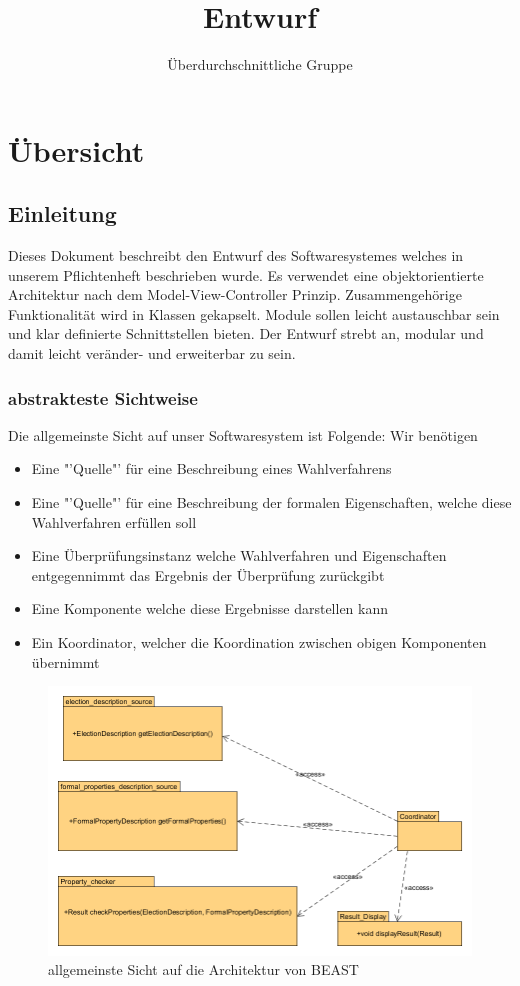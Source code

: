 \documentclass[a4paper]{scrreprt}
\begin{document}
\title{Entwurf}
\author{Überdurchschnittliche Gruppe}
\maketitle 
\chapter{Übersicht}
\section{Einleitung}
Dieses Dokument beschreibt den Entwurf des Softwaresystemes welches in unserem Pflichtenheft beschrieben wurde. Es verwendet eine objektorientierte Architektur nach dem Model-View-Controller Prinzip. Zusammengehörige Funktionalität wird in Klassen gekapselt. Module sollen leicht austauschbar sein und klar definierte Schnittstellen bieten. Der Entwurf strebt an, modular und damit leicht veränder- und erweiterbar zu sein.

\subsection{abstrakteste Sichtweise} \label{abstract_section}
Die allgemeinste Sicht auf unser Softwaresystem ist Folgende: Wir benötigen
\begin{itemize}
\item Eine "'Quelle"' für eine Beschreibung eines Wahlverfahrens
\item Eine "'Quelle"' für eine Beschreibung der formalen Eigenschaften, welche diese Wahlverfahren erfüllen soll		
\item Eine Überprüfungsinstanz welche Wahlverfahren und Eigenschaften entgegennimmt das Ergebnis der Überprüfung zurückgibt
\item Eine Komponente welche diese Ergebnisse darstellen kann
\item Ein Koordinator, welcher die Koordination zwischen obigen Komponenten übernimmt
\end{itemize}

\begin{figure}[H]
\includegraphics[scale=0.5]{highest-level-general-view.png}
\caption{allgemeinste Sicht auf die Architektur von BEAST}
\label{most_general_view_of_beast_architecture}
\end{figure}
\end{document}

